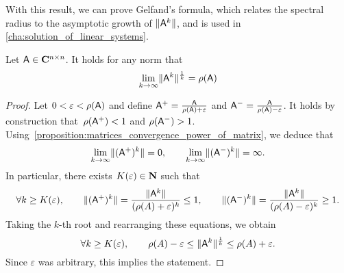 With this result,
we can prove Gelfand's formula,
which relates the spectral radius to the asymptotic growth of $\lVert\mathsf A^k\rVert$,
and is used in \cref{cha:solution_of_linear_systems}.
\begin{proposition}
    \label{proposition:matrices_gelfands}
    Let $\mathsf A \in \mathbf C^{n \times n}$.
    It holds for any norm that
    \[
        \lim_{k \to \infty} \lVert\mathsf A^k\rVert^{\frac{1}{k}} = \rho(\mathsf A)
    \]
\end{proposition}
\begin{proof}
    Let $0 < \varepsilon < \rho(\mathsf A)$
    and define $\mathsf A^+ = \frac{\mathsf A}{\rho(\mathsf A) + \varepsilon}$ and $\mathsf A^- = \frac{\mathsf A}{\rho(\mathsf A) - \varepsilon}$.
    It holds by construction that~$\rho(\mathsf A^+) < 1$ and $\rho(\mathsf A^-) > 1$.
    Using~\cref{proposition:matrices_convergence_power_of_matrix}, we deduce that
    \[
        \lim_{k \to \infty} \lVert(\mathsf A^+)^k\rVert = 0, \qquad \lim_{k \to \infty} \lVert(\mathsf A^-)^k\rVert = \infty.
    \]
    In particular,
    there exists $K(\varepsilon) \in \mathbf N$ such that
    \[
        \forall k \geq K(\varepsilon), \qquad
        \lVert(\mathsf A^+)^k\rVert = \frac{\lVert\mathsf A^k\rVert}{(\rho(A) + \varepsilon)^k} \leq 1,
        \qquad \lVert(\mathsf A^-)^k\rVert = \frac{\lVert\mathsf A^k\rVert}{(\rho(A) - \varepsilon)^k}  \geq 1.
    \]
    Taking the $k$-th root and rearranging these equations,
    we obtain
    \[
        \forall k \geq K(\varepsilon), \qquad
        \rho(A) - \varepsilon \leq \lVert\mathsf A^k\rVert^{\frac{1}{k}} \leq \rho(A) + \varepsilon.
    \]
    Since $\varepsilon$ was arbitrary,
    this implies the statement.
\end{proof}
